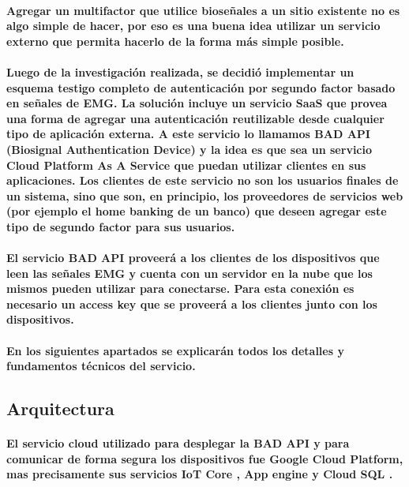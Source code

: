 \documentclass{article}
\begin{document}
\paragraph{
Agregar un multifactor que utilice bioseñales a un sitio existente no es algo simple de hacer, por eso es una buena idea utilizar un servicio externo que permita hacerlo de la forma más simple posible.
}
\paragraph{
Luego de la investigación realizada, se decidió implementar un esquema testigo completo de autenticación por segundo factor basado en señales de EMG.  La solución incluye un servicio SaaS que provea una forma de agregar una autenticación reutilizable desde cualquier tipo de aplicación externa. A este servicio lo llamamos BAD API (Biosignal Authentication Device) y la idea es que sea un servicio Cloud Platform As A Service que puedan utilizar clientes en sus aplicaciones. Los clientes de este servicio no son los usuarios finales de un sistema, sino que son, en principio, los proveedores de servicios web (por ejemplo el home banking de un banco) que deseen agregar este tipo de segundo factor para sus usuarios.
}
\paragraph{
El servicio BAD API proveerá a los clientes de los dispositivos que leen las señales EMG y cuenta con un servidor en la nube que los mismos pueden utilizar para conectarse. Para esta conexión es necesario un access key que se proveerá a los clientes junto con los dispositivos.
}
\paragraph{
En los siguientes apartados se explicarán todos los detalles y fundamentos técnicos del servicio.
}

\subsection{Arquitectura}
\paragraph{
El servicio cloud utilizado para desplegar la BAD API y para comunicar de forma segura los dispositivos fue Google Cloud Platform, mas precisamente sus servicios IoT Core \cite{GoogleIotCore}, App engine \cite{GoogleAppEngine} y Cloud SQL \cite{GoogleCloudSQL}.
}
\end{document}
